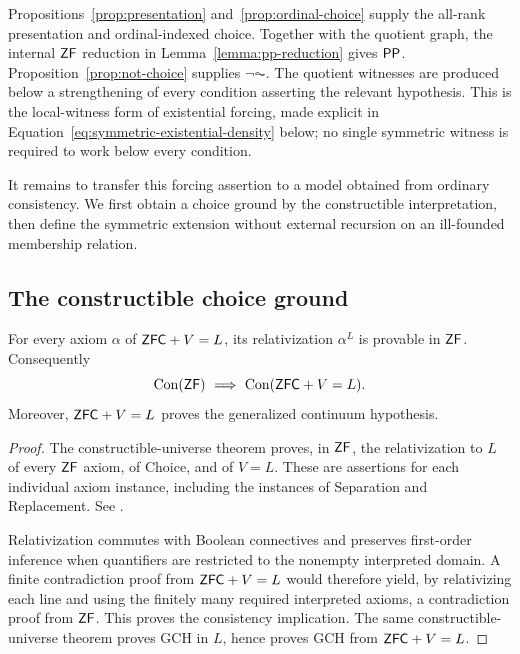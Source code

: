 Propositions~\ref{prop:presentation} and~\ref{prop:ordinal-choice}
supply the all-rank presentation and ordinal-indexed choice.
Together with the quotient graph, the internal $\mathsf{ZF}$ reduction in
Lemma~\ref{lemma:pp-reduction} gives $\mathsf{PP}$.
Proposition~\ref{prop:not-choice} supplies $\neg\AC$.
The quotient witnesses are produced below a strengthening of every
condition asserting the relevant hypothesis. This is the local-witness
form of existential forcing, made explicit in
Equation~\eqref{eq:symmetric-existential-density} below; no single
symmetric witness is required to work below every condition.

It remains to transfer this forcing assertion to a model obtained
from ordinary consistency. We first obtain a choice ground by the
constructible interpretation, then define the symmetric extension
without external recursion on an ill-founded membership relation.

\subsection{The constructible choice ground}

\begin{lemma}\label{lem:constructible-consistency}
For every axiom $\alpha$ of $\mathsf{ZFC}+V=L$, its relativization
$\alpha^L$ is provable in $\mathsf{ZF}$. Consequently
\[
 \Con(\ZF)\ \Longrightarrow\ \Con(\ZFC+V=L).
\]
Moreover, $\mathsf{ZFC}+V=L$ proves the generalized continuum hypothesis.
\end{lemma}

\begin{proof}
The constructible-universe theorem proves, in $\mathsf{ZF}$, the
relativization to $L$ of every $\mathsf{ZF}$ axiom, of Choice, and of
$V=L$. These are assertions for each individual axiom instance,
including the instances of Separation and Replacement. See
\cite[Theorem~4.7, Lemma~4.10, Corollary~4.13, and
Theorems~4.14 and~4.18]{Welch2020}.

Relativization commutes with Boolean connectives and preserves
first-order inference when quantifiers are restricted to the
nonempty interpreted domain. A finite contradiction proof from
$\mathsf{ZFC}+V=L$ would therefore yield, by relativizing each line and
using the finitely many required interpreted axioms, a
contradiction proof from $\mathsf{ZF}$. This proves the consistency
implication. The same constructible-universe theorem proves GCH
in $L$, hence proves GCH from $\mathsf{ZFC}+V=L$.
\end{proof}

